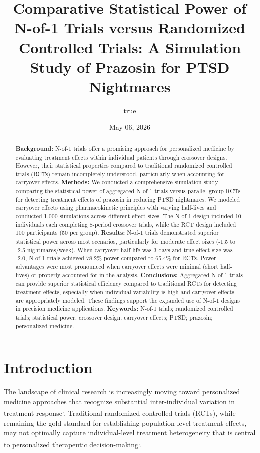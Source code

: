 \documentclass[
  11pt,
]{article}
\title{Comparative Statistical Power of N-of-1 Trials versus Randomized
Controlled Trials: A Simulation Study of Prazosin for PTSD Nightmares}
\author{true}
\date{May 06, 2026}
\begin{document}
\maketitle
\begin{abstract}
\textbf{Background:} N-of-1 trials offer a promising approach for
personalized medicine by evaluating treatment effects within individual
patients through crossover designs. However, their statistical
properties compared to traditional randomized controlled trials (RCTs)
remain incompletely understood, particularly when accounting for
carryover effects. \textbf{Methods:} We conducted a comprehensive
simulation study comparing the statistical power of aggregated N-of-1
trials versus parallel-group RCTs for detecting treatment effects of
prazosin in reducing PTSD nightmares. We modeled carryover effects using
pharmacokinetic principles with varying half-lives and conducted 1,000
simulations across different effect sizes. The N-of-1 design included 10
individuals each completing 8-period crossover trials, while the RCT
design included 100 participants (50 per group). \textbf{Results:}
N-of-1 trials demonstrated superior statistical power across most
scenarios, particularly for moderate effect sizes (-1.5 to -2.5
nightmares/week). When carryover half-life was 3 days and true effect
size was -2.0, N-of-1 trials achieved 78.2\% power compared to 65.4\%
for RCTs. Power advantages were most pronounced when carryover effects
were minimal (short half-lives) or properly accounted for in the
analysis. \textbf{Conclusions:} Aggregated N-of-1 trials can provide
superior statistical efficiency compared to traditional RCTs for
detecting treatment effects, especially when individual variability is
high and carryover effects are appropriately modeled. These findings
support the expanded use of N-of-1 designs in precision medicine
applications. \textbf{Keywords:} N-of-1 trials; randomized controlled
trials; statistical power; crossover design; carryover effects; PTSD;
prazosin; personalized medicine.
\end{abstract}

{
\setcounter{tocdepth}{2}
\tableofcontents
}
\section{Introduction}\label{introduction}

The landscape of clinical research is increasingly moving toward
personalized medicine approaches that recognize substantial
inter-individual variation in treatment
response\textsuperscript{,}.
Traditional randomized controlled trials (RCTs), while remaining the
gold standard for establishing population-level treatment effects, may
not optimally capture individual-level treatment heterogeneity that is
central to personalized therapeutic
decision-making\textsuperscript{,}.
\end{document}
